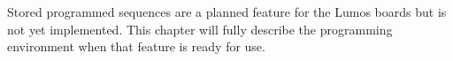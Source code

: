 \documentclass[letterpaper,twoside,onecolumn,openright,final]{memoir}
\begin{document}
\begin{NotImplemented*}{Stored programmed sequences are a planned feature for the Lumos boards but is not
yet implemented.  This chapter will fully describe the programming environment when that feature is
ready for use.}

\end{NotImplemented*}
\end{document}
